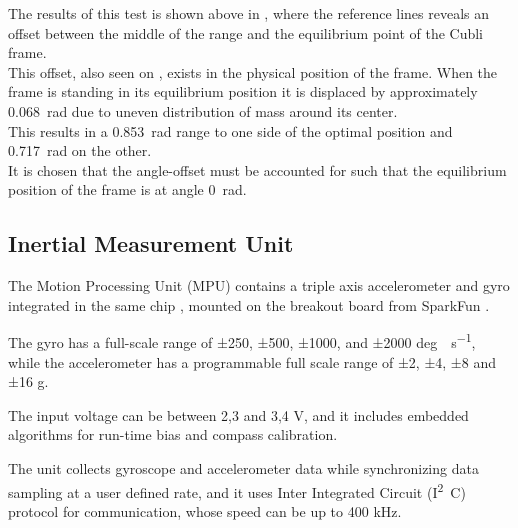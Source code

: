 The results of this test is shown above in , where the reference lines reveals an offset between the middle of the range and the equilibrium point of the Cubli frame.\\
This offset, also seen on , exists in the physical position of the frame. When the frame is standing in its equilibrium position it is displaced by approximately \SI{0,068}{rad} due to uneven distribution of mass around its center.\\
This results in a \SI{0,853}{rad} range to one side of the optimal position and \SI{0,717}{rad} on the other.\\
It is chosen that the angle-offset must be accounted for such that the equilibrium position of the frame is at angle \SI{0}{rad}.


\subsection{Inertial Measurement Unit}
The Motion Processing Unit (MPU) contains a triple axis accelerometer and gyro integrated in the same chip \cite{IMU}, mounted on the breakout board from SparkFun \cite{Sparkfun}.

The gyro has a  full-scale range of ±250, ±500, ±1000, and ±2000 \si{deg \cdot s^{-1}}, while the accelerometer has a programmable full scale range of ±2, ±4, ±8 and ±16 g.

The input voltage can be between 2,3 and 3,4 V, and it includes embedded algorithms for run-time bias and compass calibration.

The unit collects gyroscope and accelerometer data while synchronizing data sampling at a user defined rate, and it uses Inter Integrated Circuit (\si{I^2C}) protocol for communication, whose speed can be up to 400 kHz. 


%
%


